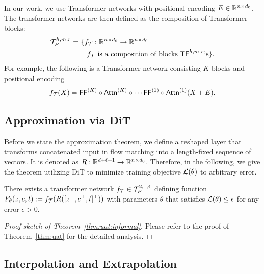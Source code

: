 In our work, we use Transformer networks with positional encoding $E\in\mathbb{R}^{n \times d_0}$. The transformer networks are then defined as the composition of Transformer blocks:
\begin{align*}
    {\cal T}_{P}^{h,m,r} = & ~ \{f_{{\cal T}}:\mathbb{R}^{ n \times d_0 }\rightarrow {\mathbb{R}^{n \times d_0}} \\
    & ~ \mid f_{{\cal T}}\text{ is a composition of blocks }{\sf TF}^{h,m,r}\text{'s}\}.
\end{align*}
For example, the following is a Transformer network consisting $K$ blocks and positional encoding
\begin{align*}
f_{{\cal T}}(X)= {\sf FF}^{(K)} \circ {\sf Attn}^{(K)} \circ  \cdots {\sf FF}^{(1)} \circ  {\sf Attn}^{(1)} (X+E).
\end{align*}

\subsection{Approximation via DiT}\label{sub:approx}



Before we state the approximation theorem, we define a reshaped layer that transforms concatenated input in flow matching into a length-fixed sequence of vectors. It is denoted as $R: \mathbb{R}^{d+\ell+1} \rightarrow \mathbb{R}^{n \times d_0}$. Therefore, in the following, we give the theorem utilizing DiT to minimize training objective ${\cal L}(\theta)$ to arbitrary error.

\begin{theorem}\label{thm:uat:informal}
    There exists a transformer network $f_{\cal T} \in {\cal T}_{P}^{2, 1, 4}$ defining function $F_\theta(z, c, t) := f_{\cal T}( R([z^\top, c^\top, t]^\top) )$ with parameters $\theta$ that satisfies ${\cal L}(\theta) \leq \epsilon$ for any error $\epsilon > 0$. 
\end{theorem}

\begin{proof}[Proof sketch of Theorem~\ref{thm:uat:informal}]
    Please refer to the proof of Theorem~\ref{thm:uat} for the detailed analysis.
\end{proof}


\subsection{Interpolation and Extrapolation}\label{sub:inter-extra_polation_theory}


